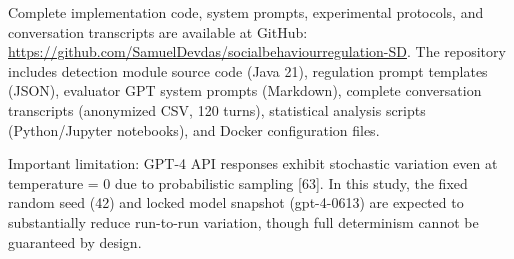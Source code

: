 Complete implementation code, system prompts, experimental protocols, and conversation transcripts are available at GitHub: \url{https://github.com/SamuelDevdas/socialbehaviourregulation-SD}. The repository includes detection module source code (Java 21), regulation prompt templates (JSON), evaluator GPT system prompts (Markdown), complete conversation transcripts (anonymized CSV, 120 turns), statistical analysis scripts (Python/Jupyter notebooks), and Docker configuration files.

Important limitation: GPT-4 API responses exhibit stochastic variation even at temperature = 0 due to probabilistic sampling {[}63{]}. In this study, the fixed random seed (42) and locked model snapshot (gpt-4-0613) are expected to substantially reduce run-to-run variation, though full determinism cannot be guaranteed by design.

